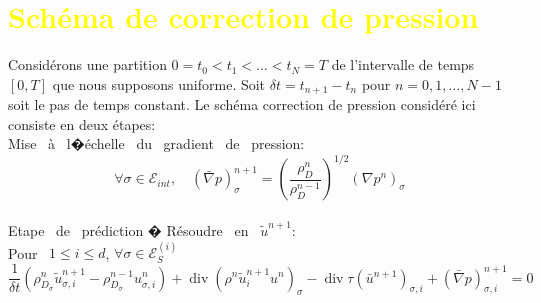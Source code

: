 \documentclass[12pt,a4paper]{article}
\begin{document}
\boldmath
\section*{\textcolor{yellow}{Schéma de correction de pression}}
Considérons une partition $0=t_{0}<t_{1}<\ldots<t_{N}=T$ de l'intervalle de temps $[0, T]$ que nous supposons uniforme. Soit $\delta t=t_{n+1}-t_{n}$ pour $n=0,1, \ldots, N-1$ soit le pas de temps constant. Le schéma correction de pression considéré ici consiste en deux étapes:\\
 Mise \ à \ l�échelle \ du \ gradient \ de \ pression: \\
 $$ \forall \sigma \in \mathcal{E}_{int }, \quad(\bar{\nabla} p)_{\sigma}^{n+1}=\left(\frac{\rho_{D}^{n}}{\rho_{D}^{n-1}}\right)^{1 / 2}\left(\nabla p^{n}\right)_{\sigma}$$
 \\
 Etape \ de \ prédiction � Résoudre \ en \ $\tilde{u}^{n+1}$: \\
 Pour \  $1 \le i \le d$, $\forall \sigma \in \mathcal{E}_{S}^{(i)}$  \\
 $$\frac{1}{\delta t}\left(\rho_{D_{\sigma}}^{n} \tilde{u}_{\sigma, i}^{n+1}-\rho_{D_{\sigma}}^{n-1} u_{\sigma, i}^{n}\right)+\operatorname{div}\left(\rho^{n} \tilde{u}_{i}^{n+1} u^{n}\right)_{\sigma}-\operatorname{div} \tau\left(\bar{u}^{n+1}\right)_{\sigma, i}+(\bar{\nabla} p)_{\sigma, i}^{n+1}=0$$
\end{document}
